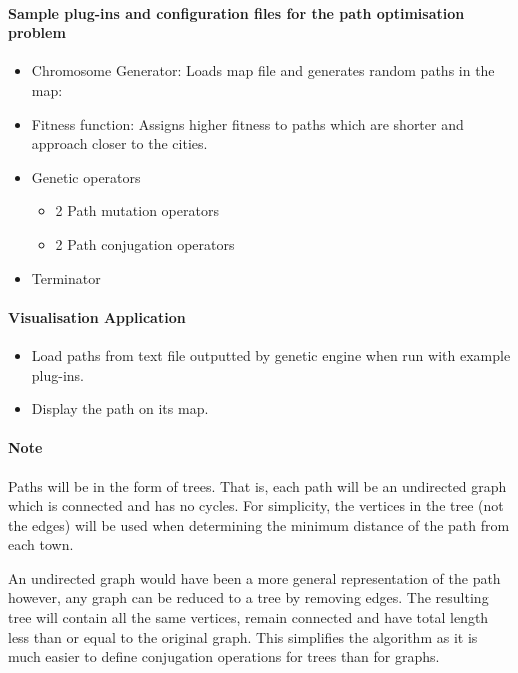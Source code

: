 \paragraph*{Sample plug-ins and configuration files for the path optimisation problem}
\begin{itemize}
 \item{Chromosome Generator}: Loads map file and generates random paths in the map:
 \item{Fitness function}: Assigns higher fitness to paths which are shorter and approach closer to the cities.
 \item{Genetic operators}
 \begin{itemize}
  \item 2 Path mutation operators 
  \item 2 Path conjugation operators
 \end{itemize}
 \item Terminator
\end{itemize}

\paragraph*{Visualisation Application}
\begin{itemize}
 \item Load paths from text file outputted by genetic engine when run with example plug-ins.
 \item Display the path on its map.
\end{itemize}

\paragraph{Note}
Paths will be in the form of trees. That is, each path will be an undirected graph which is connected and has no cycles. For simplicity, the vertices in the tree (not the edges) will be used when determining the minimum distance of the path from each town.

An undirected graph would have been a more general representation of the path however, any graph can be reduced to a tree by removing edges. The resulting tree will contain all the same vertices, remain connected and have total length less than or equal to the original graph. This simplifies the algorithm as it is much easier to define conjugation operations for trees than for graphs.


\subsection{}

